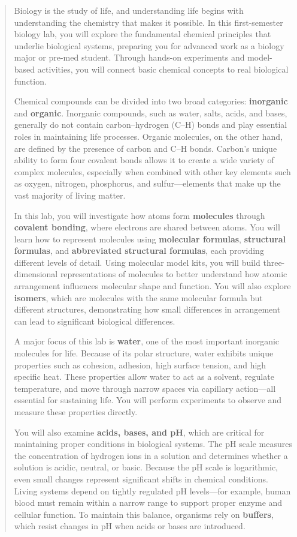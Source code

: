 \documentclass[
  letterpaper,
  DIV=11,
  numbers=noendperiod]{scrreprt}
\begin{document}
\begin{quote}
Biology is the study of life, and understanding life begins with
understanding the chemistry that makes it possible. In this
first-semester biology lab, you will explore the fundamental chemical
principles that underlie biological systems, preparing you for advanced
work as a biology major or pre-med student. Through hands-on experiments
and model-based activities, you will connect basic chemical concepts to
real biological function.

Chemical compounds can be divided into two broad categories:
\textbf{inorganic} and \textbf{organic}. Inorganic compounds, such as
water, salts, acids, and bases, generally do not contain
carbon--hydrogen (C--H) bonds and play essential roles in maintaining
life processes. Organic molecules, on the other hand, are defined by the
presence of carbon and C--H bonds. Carbon's unique ability to form four
covalent bonds allows it to create a wide variety of complex molecules,
especially when combined with other key elements such as oxygen,
nitrogen, phosphorus, and sulfur---elements that make up the vast
majority of living matter.

In this lab, you will investigate how atoms form \textbf{molecules}
through \textbf{covalent bonding}, where electrons are shared between
atoms. You will learn how to represent molecules using \textbf{molecular
formulas}, \textbf{structural formulas}, and \textbf{abbreviated
structural formulas}, each providing different levels of detail. Using
molecular model kits, you will build three-dimensional representations
of molecules to better understand how atomic arrangement influences
molecular shape and function. You will also explore \textbf{isomers},
which are molecules with the same molecular formula but different
structures, demonstrating how small differences in arrangement can lead
to significant biological differences.

A major focus of this lab is \textbf{water}, one of the most important
inorganic molecules for life. Because of its polar structure, water
exhibits unique properties such as cohesion, adhesion, high surface
tension, and high specific heat. These properties allow water to act as
a solvent, regulate temperature, and move through narrow spaces via
capillary action---all essential for sustaining life. You will perform
experiments to observe and measure these properties directly.

You will also examine \textbf{acids, bases, and pH}, which are critical
for maintaining proper conditions in biological systems. The pH scale
measures the concentration of hydrogen ions in a solution and determines
whether a solution is acidic, neutral, or basic. Because the pH scale is
logarithmic, even small changes represent significant shifts in chemical
conditions. Living systems depend on tightly regulated pH levels---for
example, human blood must remain within a narrow range to support proper
enzyme and cellular function. To maintain this balance, organisms rely
on \textbf{buffers}, which resist changes in pH when acids or bases are
introduced.


\end{quote}
\end{document}
